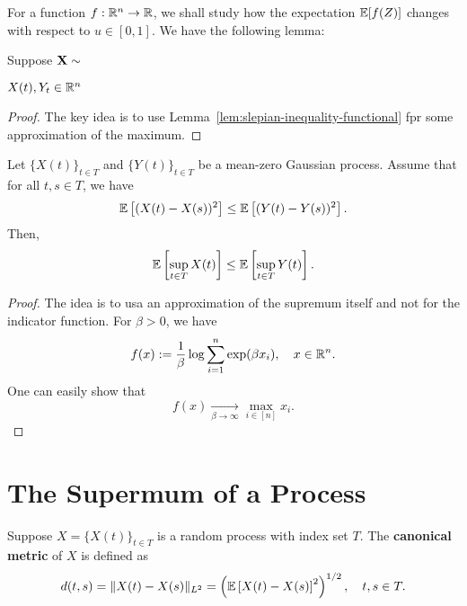 For a function \(f:\mathbb{R}^{n}\to\mathbb{R}\), we shall study how the expectation \(\mathbb{E}[f(Z)]\) changes with respect to \(u\in[0,1]\). We have the following lemma:
\begin{lemma}
	Suppose \(\mathbf{X}\sim\)
\end{lemma}

\begin{lemma}\label{lem:slepian-inequality-functional}

\end{lemma}

\(X(t),Y_{t}\in\mathbb{R}^{n}\)

\begin{proof}
	The key idea is to use Lemma~\ref{lem:slepian-inequality-functional} fpr some approximation of the maximum.
\end{proof}

\begin{theorem}
	Let \(\{X(t)\}_{t\in T}\) and \(\{Y(t)\}_{t\in T}\) be a mean-zero Gaussian process. Assume that for all \(t,s\in T\), we have
	\begin{equation*}
		\mathbb{E}\left[(X(t)-X(s))^{2}\right]\leq\mathbb{E}\left[(Y(t)-Y(s))^{2}\right].
	\end{equation*}
	Then,
	\begin{equation*}
		\mathbb{E}\left[\sup_{t\in T}X(t)\right]\leq\mathbb{E}\left[\sup_{t\in T}Y(t)\right].
	\end{equation*}
\end{theorem}

\begin{proof}
	The idea is to usa an approximation of the supremum itself and not for the indicator function. For \(\beta>0\), we have
	\begin{equation*}
		f(x):=\frac{1}{\beta}\log\sum_{i=1}^{n}\exp(\beta x_{i}),\quad x\in\mathbb{R}^{n}.
	\end{equation*}
	One can easily show that
	\begin{equation*}
		f(x)\underset{\beta\to\infty}{\longrightarrow}\max_{i\in[n]}x_{i}.
	\end{equation*}
\end{proof}

\section{The Supermum of a Process}

\begin{definition}
	Suppose \(X=\{X(t)\}_{t\in T}\) is a random process with index set \(T\). The \textbf{canonical metric} of \(X\) is defined as
	\begin{equation}
		d(t,s)=\|X(t)-X(s)\|_{L^{2}}=\left(\mathbb{E}\left[X(t)-X(s)\right]^{2}\right)^{1/2},\quad t,s\in T.
	\end{equation}
\end{definition}

